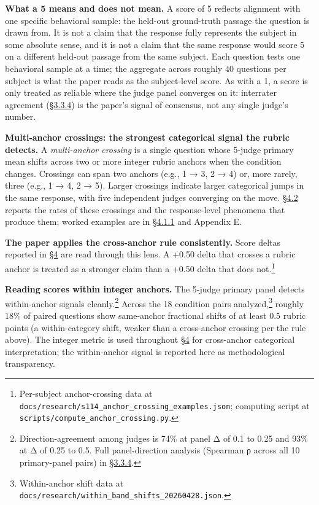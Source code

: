 \textbf{What a 5 means and does not mean.} A score of 5 reflects
alignment with one specific behavioral sample: the held-out ground-truth
passage the question is drawn from. It is not a claim that the response
fully represents the subject in some absolute sense, and it is not a
claim that the same response would score 5 on a different held-out
passage from the same subject. Each question tests one behavioral sample
at a time; the aggregate across roughly 40 questions per subject is what
the paper reads as the subject-level score. As with a 1, a score is only
treated as reliable where the judge panel converges on it: interrater
agreement (\hyperref[inter-judge-agreement]{§3.3.4}) is the paper's signal of consensus, not any single
judge's number.

\textbf{Multi-anchor crossings: the strongest categorical signal the
rubric detects.} A \emph{multi-anchor crossing} is a single question
whose 5-judge primary mean shifts across two or more integer rubric
anchors when the condition changes. Crossings can span two anchors
(e.g., 1 → 3, 2 → 4) or, more rarely, three (e.g., 1 → 4, 2 → 5). Larger
crossings indicate larger categorical jumps in the same response, with
five independent judges converging on the move. \hyperref[compression-structure-vs.-raw-text]{§4.2} reports the rates
of these crossings and the response-level phenomena that produce them;
worked examples are in \hyperref[per-question-baseline-engagement-and-the-worked-rubric-example]{§4.1.1} and Appendix E.

\textbf{The paper applies the cross-anchor rule consistently.} Score
deltas reported in \hyperref[results]{§4} are read through this lens. A +0.50 delta that
crosses a rubric anchor is treated as a stronger claim than a +0.50
delta that does not.\footnote{Per-subject anchor-crossing data at
  \texttt{docs/research/s114\_anchor\_crossing\_examples.json};
  computing script at \texttt{scripts/compute\_anchor\_crossing.py}.}

\textbf{Reading scores within integer anchors.} The 5-judge primary
panel detects within-anchor signals cleanly.\footnote{Direction-agreement
  among judges is 74\% at panel \textbar Δ\textbar{} of 0.1 to 0.25 and
  93\% at \textbar Δ\textbar{} of 0.25 to 0.5. Full panel-direction
  analysis (Spearman ρ across all 10 primary-panel pairs) in \hyperref[inter-judge-agreement]{§3.3.4}.}
Across the 18 condition pairs analyzed,\footnote{Within-anchor shift
  data at \texttt{docs/research/within\_band\_shifts\_20260428.json}.}
roughly 18\% of paired questions show same-anchor fractional shifts of
at least 0.5 rubric points (a within-category shift, weaker than a
cross-anchor crossing per the rule above). The integer metric is used
throughout \hyperref[results]{§4} for cross-anchor categorical interpretation; the
within-anchor signal is reported here as methodological transparency.

